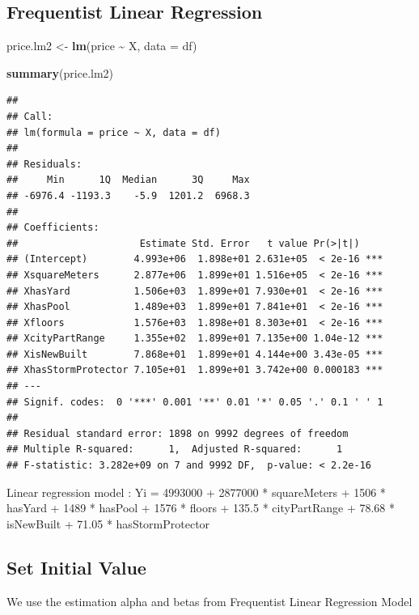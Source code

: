 \documentclass[
]{article}
\newenvironment{Shaded}{\begin{snugshade}}{\end{snugshade}}
\newcommand{\AttributeTok}[1]{\textcolor[rgb]{0.13,0.29,0.53}{#1}}
\newcommand{\FunctionTok}[1]{\textcolor[rgb]{0.13,0.29,0.53}{\textbf{#1}}}
\newcommand{\NormalTok}[1]{#1}
\newcommand{\OtherTok}[1]{\textcolor[rgb]{0.56,0.35,0.01}{#1}}
\newcommand{\SpecialCharTok}[1]{\textcolor[rgb]{0.81,0.36,0.00}{\textbf{#1}}}
\begin{document}
\subsection{Frequentist Linear
Regression}\label{frequentist-linear-regression}

\begin{Shaded}
\begin{Highlighting}[]
\NormalTok{price.lm2 }\OtherTok{\textless{}{-}} \FunctionTok{lm}\NormalTok{(price }\SpecialCharTok{\textasciitilde{}}\NormalTok{ X, }\AttributeTok{data =}\NormalTok{ df)}

\FunctionTok{summary}\NormalTok{(price.lm2)}
\end{Highlighting}
\end{Shaded}

\begin{verbatim}
## 
## Call:
## lm(formula = price ~ X, data = df)
## 
## Residuals:
##     Min      1Q  Median      3Q     Max 
## -6976.4 -1193.3    -5.9  1201.2  6968.3 
## 
## Coefficients:
##                     Estimate Std. Error   t value Pr(>|t|)    
## (Intercept)        4.993e+06  1.898e+01 2.631e+05  < 2e-16 ***
## XsquareMeters      2.877e+06  1.899e+01 1.516e+05  < 2e-16 ***
## XhasYard           1.506e+03  1.899e+01 7.930e+01  < 2e-16 ***
## XhasPool           1.489e+03  1.899e+01 7.841e+01  < 2e-16 ***
## Xfloors            1.576e+03  1.898e+01 8.303e+01  < 2e-16 ***
## XcityPartRange     1.355e+02  1.899e+01 7.135e+00 1.04e-12 ***
## XisNewBuilt        7.868e+01  1.899e+01 4.144e+00 3.43e-05 ***
## XhasStormProtector 7.105e+01  1.899e+01 3.742e+00 0.000183 ***
## ---
## Signif. codes:  0 '***' 0.001 '**' 0.01 '*' 0.05 '.' 0.1 ' ' 1
## 
## Residual standard error: 1898 on 9992 degrees of freedom
## Multiple R-squared:      1,  Adjusted R-squared:      1 
## F-statistic: 3.282e+09 on 7 and 9992 DF,  p-value: < 2.2e-16
\end{verbatim}

Linear regression model : Yi = 4993000 + 2877000 * squareMeters + 1506 *
hasYard + 1489 * hasPool + 1576 * floors + 135.5 * cityPartRange + 78.68
* isNewBuilt + 71.05 * hasStormProtector

\subsection{Set Initial Value}\label{set-initial-value-2}

We use the estimation alpha and betas from Frequentist Linear Regression
Model
\end{document}
